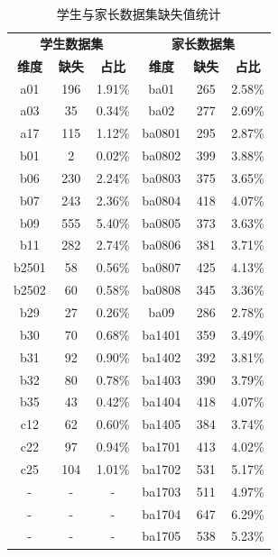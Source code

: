 \documentclass[zihao = -4, linespread = 1.5]{article}
\begin{document}
\begin{table}[!t]
    \centering
    \setlength{\tabcolsep}{8pt}
    \renewcommand{\arraystretch}{0.75}
    \caption{学生与家长数据集缺失值统计}\label{table-missing}
    \begin{tabular}{ccc|ccc}
        \bottomrule[1.5pt]
        \multicolumn{3}{c|}{\textbf{学生数据集}} & \multicolumn{3}{c}{\textbf{家长数据集}} \\
        \textbf{维度} & \textbf{缺失} & \textbf{占比} & \textbf{维度} & \textbf{缺失} & \textbf{占比} \\
        \hline
        a01   & 196 & 1.91\% & ba01   & 265 & 2.58\% \\
        a03   & 35  & 0.34\% & ba02   & 277 & 2.69\% \\
        a17   & 115 & 1.12\% & ba0801 & 295 & 2.87\% \\
        b01   & 2   & 0.02\% & ba0802 & 399 & 3.88\% \\
        b06   & 230 & 2.24\% & ba0803 & 375 & 3.65\% \\
        b07   & 243 & 2.36\% & ba0804 & 418 & 4.07\% \\
        b09   & 555 & 5.40\% & ba0805 & 373 & 3.63\% \\
        b11   & 282 & 2.74\% & ba0806 & 381 & 3.71\% \\
        b2501 & 58  & 0.56\% & ba0807 & 425 & 4.13\% \\
        b2502 & 60  & 0.58\% & ba0808 & 345 & 3.36\% \\
        b29   & 27  & 0.26\% & ba09   & 286 & 2.78\% \\
        b30   & 70  & 0.68\% & ba1401 & 359 & 3.49\% \\
        b31   & 92  & 0.90\% & ba1402 & 392 & 3.81\% \\
        b32   & 80  & 0.78\% & ba1403 & 390 & 3.79\% \\
        b35   & 43  & 0.42\% & ba1404 & 418 & 4.07\% \\
        c12   & 62  & 0.60\% & ba1405 & 384 & 3.74\% \\
        c22   & 97  & 0.94\% & ba1701 & 413 & 4.02\% \\
        c25   & 104 & 1.01\% & ba1702 & 531 & 5.17\% \\
        -     & -   & -      & ba1703 & 511 & 4.97\% \\
        -     & -   & -      & ba1704 & 647 & 6.29\% \\
        -     & -   & -      & ba1705 & 538 & 5.23\% \\

\end{tabular}
\end{table}
\end{document}
